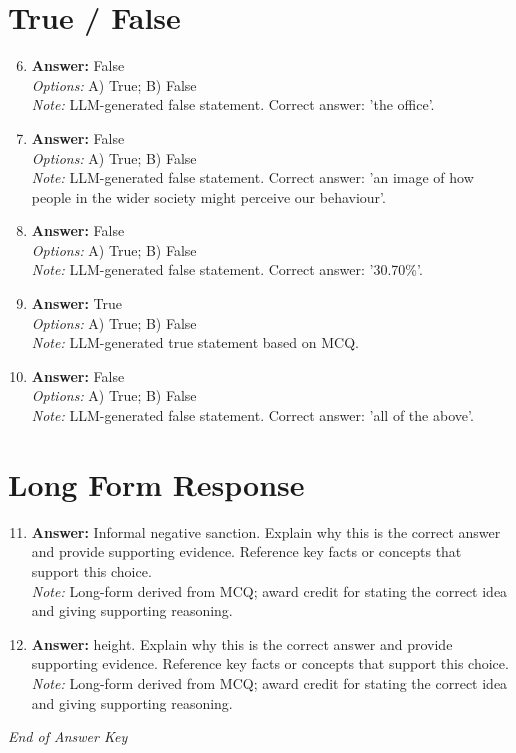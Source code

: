 \documentclass[12pt]{article}
\begin{document}
\section*{True / False}
\begin{enumerate}[label=\arabic*.]
\setcounter{enumi}{5}
\item \textbf{Answer:} False
\\ \textit{Options:} A) True; B) False
\\ \textit{Note:} LLM-generated false statement. Correct answer: 'the office'.
\item \textbf{Answer:} False
\\ \textit{Options:} A) True; B) False
\\ \textit{Note:} LLM-generated false statement. Correct answer: 'an image of how people in the wider society might perceive our behaviour'.
\item \textbf{Answer:} False
\\ \textit{Options:} A) True; B) False
\\ \textit{Note:} LLM-generated false statement. Correct answer: '30.70\%'.
\item \textbf{Answer:} True
\\ \textit{Options:} A) True; B) False
\\ \textit{Note:} LLM-generated true statement based on MCQ.
\item \textbf{Answer:} False
\\ \textit{Options:} A) True; B) False
\\ \textit{Note:} LLM-generated false statement. Correct answer: 'all of the above'.
\end{enumerate}

\section*{Long Form Response}
\begin{enumerate}[label=\arabic*.]
\setcounter{enumi}{10}
\item \textbf{Answer:} Informal negative sanction. Explain why this is the correct answer and provide supporting evidence. Reference key facts or concepts that support this choice.
\\ \textit{Note:} Long-form derived from MCQ; award credit for stating the correct idea and giving supporting reasoning.
\item \textbf{Answer:} height. Explain why this is the correct answer and provide supporting evidence. Reference key facts or concepts that support this choice.
\\ \textit{Note:} Long-form derived from MCQ; award credit for stating the correct idea and giving supporting reasoning.
\end{enumerate}

\vfill
\noindent\textit{End of Answer Key}
\end{document}
